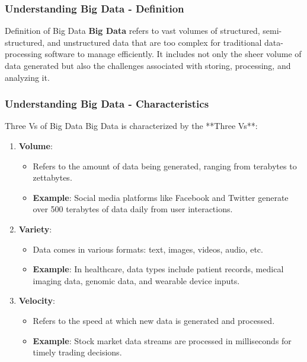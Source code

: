 \documentclass[aspectratio=169]{beamer}
\begin{document}
\begin{frame}[fragile]
    \frametitle{Understanding Big Data - Definition}
    \begin{block}{Definition of Big Data}
        \textbf{Big Data} refers to vast volumes of structured, semi-structured, and unstructured data that are too complex for traditional data-processing software to manage efficiently. It includes not only the sheer volume of data generated but also the challenges associated with storing, processing, and analyzing it.
    \end{block}
\end{frame}

\begin{frame}[fragile]
    \frametitle{Understanding Big Data - Characteristics}
    \begin{block}{Three Vs of Big Data}
        Big Data is characterized by the **Three Vs**:
        \begin{enumerate}
            \item \textbf{Volume}:
                \begin{itemize}
                    \item Refers to the amount of data being generated, ranging from terabytes to zettabytes.
                    \item \textbf{Example}: Social media platforms like Facebook and Twitter generate over 500 terabytes of data daily from user interactions.
                \end{itemize}
            \item \textbf{Variety}:
                \begin{itemize}
                    \item Data comes in various formats: text, images, videos, audio, etc.
                    \item \textbf{Example}: In healthcare, data types include patient records, medical imaging data, genomic data, and wearable device inputs.
                \end{itemize}
            \item \textbf{Velocity}:
                \begin{itemize}
                    \item Refers to the speed at which new data is generated and processed.
                    \item \textbf{Example}: Stock market data streams are processed in milliseconds for timely trading decisions.
                \end{itemize}
        \end{enumerate}
    \end{block}
\end{frame}
\end{document}
